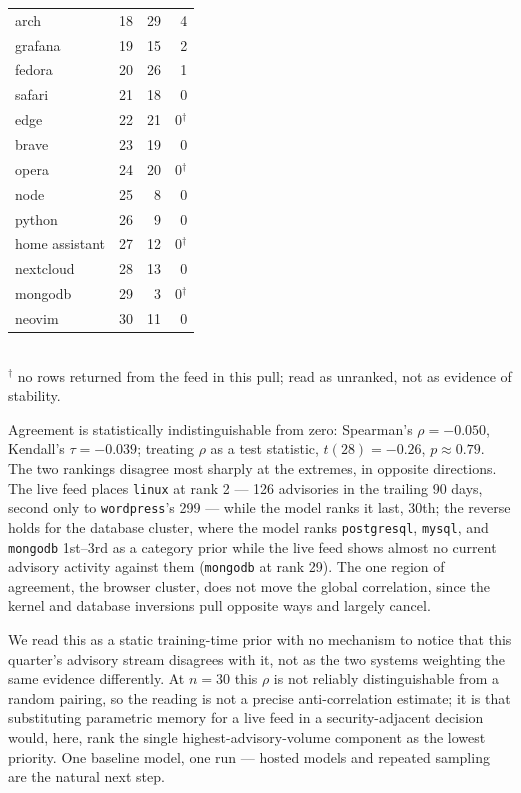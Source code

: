 \documentclass[10pt,conference]{IEEEtran}
\begin{document}
\begin{table}[t]
\begin{tabular}{@{}lrrr@{}}
arch           & 18 & 29 & 4   \\
grafana        & 19 & 15 & 2   \\
fedora         & 20 & 26 & 1   \\
safari         & 21 & 18 & 0   \\
edge           & 22 & 21 & 0$^\dagger$ \\
brave          & 23 & 19 & 0   \\
opera          & 24 & 20 & 0$^\dagger$ \\
node           & 25 & 8  & 0   \\
python         & 26 & 9  & 0   \\
home assistant & 27 & 12 & 0$^\dagger$ \\
nextcloud      & 28 & 13 & 0   \\
mongodb        & 29 & 3  & 0$^\dagger$ \\
neovim         & 30 & 11 & 0   \\
\bottomrule
\end{tabular}
\\[2pt]
{\footnotesize $^\dagger$ no rows returned from the feed in this pull; read
as unranked, not as evidence of stability.}
\end{table}

Agreement is statistically indistinguishable from zero: Spearman's
$\rho=-0.050$, Kendall's $\tau=-0.039$; treating $\rho$ as a test statistic,
$t(28)=-0.26$, $p\approx0.79$. The two rankings disagree most sharply at the
extremes, in opposite directions. The live feed places \texttt{linux} at rank 2
--- 126 advisories in the trailing 90 days, second only to \texttt{wordpress}'s
299 --- while the model ranks it last, 30th; the reverse holds for the database
cluster, where the model ranks \texttt{postgresql}, \texttt{mysql}, and
\texttt{mongodb} 1st--3rd as a category prior while the live feed shows almost
no current advisory activity against them (\texttt{mongodb} at rank 29). The
one region of agreement, the browser cluster, does not move the global
correlation, since the kernel and database inversions pull opposite ways and
largely cancel.

We read this as a static training-time prior with no mechanism to notice that
this quarter's advisory stream disagrees with it, not as the two systems
weighting the same evidence differently. At $n=30$ this $\rho$ is not reliably
distinguishable from a random pairing, so the reading is not a precise
anti-correlation estimate; it is that substituting parametric memory for a
live feed in a security-adjacent decision would, here, rank the single
highest-advisory-volume component as the lowest priority. One baseline model,
one run --- hosted models and repeated sampling are the natural next step.
\end{document}
